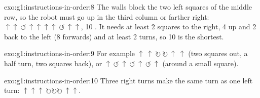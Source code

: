 \begin{solution}{exo:g1:instructions-in-order:8}
The walls block the two left squares of the middle row, so the robot must go
up in the third column or farther right:
$\uparrow\uparrow\ \circlearrowleft\ \uparrow\uparrow\uparrow\uparrow\ \circlearrowleft\ \uparrow\uparrow$,
10 . It needs at least 2 squares to the right, 4 up and 2 back to
the left (8 forwards) and at least 2 turns, so 10 is the shortest.
\end{solution}

\begin{solution}{exo:g1:instructions-in-order:9}
For example $\uparrow\ \uparrow\ \circlearrowright\ \circlearrowright\ \uparrow\ \uparrow$
(two squares out, a half turn, two squares back), or
$\uparrow\ \circlearrowleft\ \uparrow\ \circlearrowleft\ \uparrow\ \circlearrowleft\ \uparrow$
(around a small square).
\end{solution}

\begin{solution}{exo:g1:instructions-in-order:10}
Three right turns make the same turn as one left turn:
$\uparrow\uparrow\uparrow\ \circlearrowright\circlearrowright\circlearrowright\ \uparrow\uparrow$.
\end{solution}
